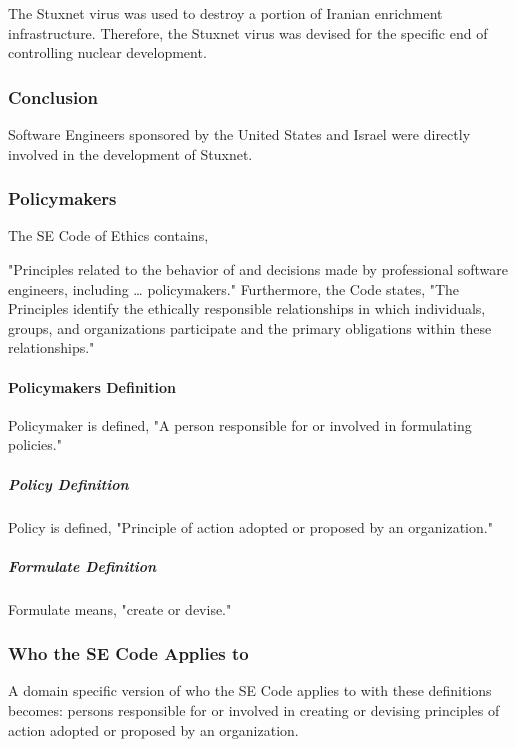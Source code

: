 \documentclass[12pt]{article}
\begin{document}
\begin{multicols}{2}
The Stuxnet virus was used to destroy a portion of Iranian enrichment infrastructure.\cite{theRealStoryOfStuxnet} Therefore, the Stuxnet virus was devised for the specific end of controlling nuclear development.

\subsubsection{Conclusion}
Software Engineers sponsored by the United States and Israel were directly involved in the development of Stuxnet.

\subsubsection{Policymakers}

The SE Code of Ethics contains,

\begin{displayquote}
"Principles related to the behavior of and decisions made by professional software engineers, including … policymakers." Furthermore, the Code states, "The Principles identify the ethically responsible relationships in which individuals, groups, and organizations participate and the primary obligations within these relationships."\cite{softwareEngineeringCodeOfEthics}
\end{displayquote}

\paragraph{Policymakers Definition}

Policymaker is defined, "A person responsible for or involved in formulating policies."\cite{oxfordDictionary}

\subparagraph{Policy Definition}

Policy is defined, "Principle of action adopted or proposed by an organization."\cite{oxfordDictionary}

\subparagraph{Formulate Definition}

Formulate means, "create or devise."\cite{oxfordDictionary}

\subsubsection{Who the SE Code Applies to}

A domain specific version of who the SE Code applies to with these definitions becomes: persons responsible for or involved in creating or devising principles of action adopted or proposed by an organization.


\end{multicols}
\end{document}
